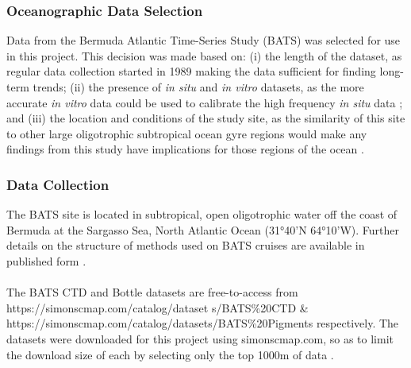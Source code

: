 \documentclass{article}
\begin{document}
\subsubsection{Oceanographic Data Selection}
Data from the Bermuda Atlantic Time-Series Study (BATS) was selected for use in this project. This decision was made based on: (i) the length of the dataset, as regular data collection started in 1989 making the data sufficient for finding long-term trends; (ii) the presence of \textit{in situ} and \textit{in vitro} datasets, as the more accurate \textit{in vitro} data could be used to calibrate the high frequency \textit{in situ} data \citep{wolfe_experimental_2006}; and (iii) the location and conditions of the study site, as the similarity of this site to other large oligotrophic subtropical ocean gyre regions would make any findings from this study have implications for those regions of the ocean \citep{alkire_using_2013}.
\noindent
\subsubsection{Data Collection}
The BATS site is located in subtropical, open oligotrophic water off the coast of Bermuda at the Sargasso Sea, North Atlantic Ocean (31°40’N 64°10’W). Further details on the structure of methods used on BATS cruises are available in published form \citep{knap_bats_1997,steinberg_overview_2001,johnson_chapter_nodate}. \\ \\
\noindent
The BATS CTD and Bottle datasets are free-to-access from https://simonscmap.com/catalog/dataset
s/BATS\%20CTD \& https://simonscmap.com/catalog/datasets/BATS\%20Pigments respectively.
The datasets were downloaded for this project using simonscmap.com, so as to limit the download size of each by selecting only the top 1000m of data \citep{steinberg_overview_2001}.
\end{document}
